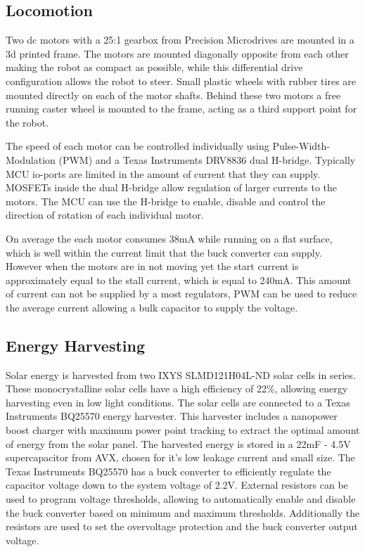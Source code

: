 \subsection{Locomotion}


Two dc motors with a 25:1 gearbox from Precision Microdrives are mounted in a 3d printed frame. %
The motors are mounted diagonally opposite from each other making the robot as compact as possible, while this differential drive configuration allows the robot to steer.
Small plastic wheels with rubber tires are mounted directly on each of the motor shafts.
Behind these two motors a free running caster wheel is mounted to the frame, acting as a third support point for the robot.

The speed of each motor can be controlled individually using Pulse-Width-Modulation (PWM) and a Texas Instruments DRV8836 dual H-bridge.
Typically MCU io-ports are limited in the amount of current that they can supply.
MOSFETs inside the dual H-bridge allow regulation of larger currents to the motors.
The MCU can use the H-bridge to enable, disable and control the direction of rotation of each individual motor.

On average the each motor consumes 38mA while running on a flat surface, which is well within the current limit that the buck converter can supply.
However when the motors are in not moving yet the start current is approximately equal to the stall current, which is equal to 240mA.
This amount of current can not be supplied by a most regulators, PWM can be used to reduce the average current allowing a bulk capacitor to supply the voltage.

\subsection{Energy Harvesting}
\label{subsec:energy_harvesting}

Solar energy is harvested from two IXYS SLMD121H04L-ND solar cells in series.
These monocrystalline solar cells have a high efficiency of 22\%, allowing energy harvesting even in low light conditions.
The solar cells are connected to a Texas Instruments BQ25570 energy harvester. 
This harvester includes a nanopower boost charger with maximum power point tracking to extract the optimal amount of energy from the solar panel. 
The harvested energy is stored in a 22mF - 4.5V supercapacitor from AVX, chosen for it's low leakage current and small size.
The Texas Instruments BQ25570 has a buck converter to efficiently regulate the capacitor voltage down to the system voltage of 2.2V.
External resistors can be used to program voltage thresholds, allowing to automatically enable and disable the buck converter based on minimum and maximum thresholds.
Additionally the resistors are used to set the overvoltage protection and the buck converter output voltage.

